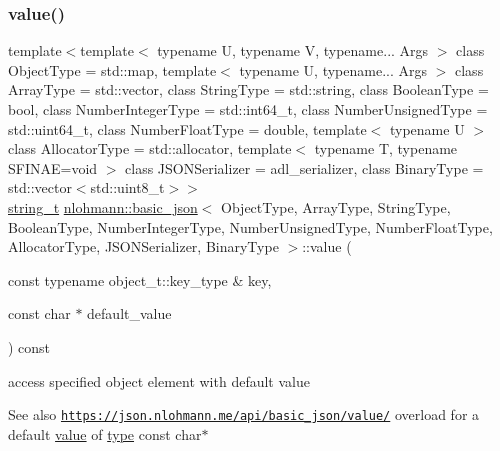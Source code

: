 \subsubsection{\texorpdfstring{value()}{value()}\hspace{0.1cm}{\footnotesize\ttfamily [2/4]}}
{\footnotesize\ttfamily template$<$template$<$ typename U, typename V, typename... Args $>$ class Object\+Type = std\+::map, template$<$ typename U, typename... Args $>$ class Array\+Type = std\+::vector, class String\+Type  = std\+::string, class Boolean\+Type  = bool, class Number\+Integer\+Type  = std\+::int64\+\_\+t, class Number\+Unsigned\+Type  = std\+::uint64\+\_\+t, class Number\+Float\+Type  = double, template$<$ typename U $>$ class Allocator\+Type = std\+::allocator, template$<$ typename T, typename S\+F\+I\+N\+A\+E=void $>$ class J\+S\+O\+N\+Serializer = adl\+\_\+serializer, class Binary\+Type  = std\+::vector$<$std\+::uint8\+\_\+t$>$$>$ \\
\hyperlink{classnlohmann_1_1basic__json_a33593865ffb1860323dcbd52425b90c8}{string\+\_\+t} \hyperlink{classnlohmann_1_1basic__json}{nlohmann\+::basic\+\_\+json}$<$ Object\+Type, Array\+Type, String\+Type, Boolean\+Type, Number\+Integer\+Type, Number\+Unsigned\+Type, Number\+Float\+Type, Allocator\+Type, J\+S\+O\+N\+Serializer, Binary\+Type $>$\+::value (\begin{DoxyParamCaption}\item[{const typename object\+\_\+t\+::key\+\_\+type \&}]{key,  }\item[{const char $\ast$}]{default\+\_\+value }\end{DoxyParamCaption}) const\hspace{0.3cm}{\ttfamily [inline]}}



access specified object element with default value 

\begin{DoxySeeAlso}{See also}
\href{https://json.nlohmann.me/api/basic_json/value/}{\tt https\+://json.\+nlohmann.\+me/api/basic\+\_\+json/value/} overload for a default \hyperlink{classnlohmann_1_1basic__json_a11641b35219676b225d9bd15c7677659}{value} of \hyperlink{classnlohmann_1_1basic__json_a5b7c4b35a0ad9f97474912a08965d7ad}{type} const char$\ast$ 
\end{DoxySeeAlso}
\mbox{\label{classnlohmann_1_1basic__json_a36bd6765ccd8aeeeb4e49a766ba639df}} 
